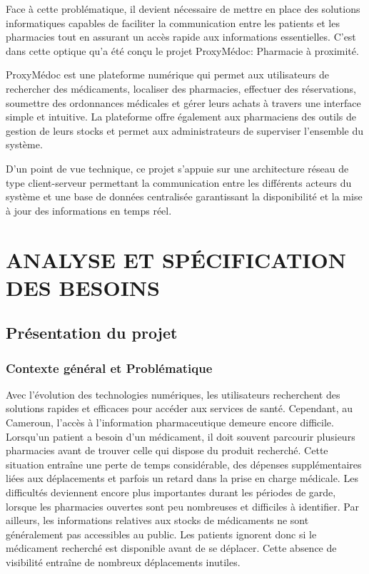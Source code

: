 \documentclass[12pt,a4paper]{report}
\begin{document}
Face à cette problématique, il devient nécessaire de mettre en place des solutions informatiques capables de faciliter la communication entre les patients et les pharmacies tout en assurant un accès rapide aux informations essentielles. C'est dans cette optique qu'a été conçu le projet ProxyMédoc: Pharmacie à proximité.

ProxyMédoc est une plateforme numérique qui permet aux utilisateurs de rechercher des médicaments, localiser des pharmacies, effectuer des réservations, soumettre des ordonnances médicales et gérer leurs achats à travers une interface simple et intuitive. La plateforme offre également aux pharmaciens des outils de gestion de leurs stocks et permet aux administrateurs de superviser l'ensemble du système.

D'un point de vue technique, ce projet s'appuie sur une architecture réseau de type client-serveur permettant la communication entre les différents acteurs du système et une base de données centralisée garantissant la disponibilité et la mise à jour des informations en temps réel.
	
	
	\part{ANALYSE ET SPÉCIFICATION DES BESOINS} %
	
	\chapter{Présentation du projet} %
	
	\section{Contexte général et Problématique} %
	Avec l'évolution des technologies numériques, les utilisateurs recherchent des solutions rapides et efficaces pour accéder aux services de santé. %
	Cependant, au Cameroun, l'accès à l'information pharmaceutique demeure encore difficile. %
	Lorsqu'un patient a besoin d'un médicament, il doit souvent parcourir plusieurs pharmacies avant de trouver celle qui dispose du produit recherché. %
	Cette situation entraîne une perte de temps considérable, des dépenses supplémentaires liées aux déplacements et parfois un retard dans la prise en charge médicale. %
	Les difficultés deviennent encore plus importantes durant les périodes de garde, lorsque les pharmacies ouvertes sont peu nombreuses et difficiles à identifier. %
	Par ailleurs, les informations relatives aux stocks de médicaments ne sont généralement pas accessibles au public. %
	Les patients ignorent donc si le médicament recherché est disponible avant de se déplacer. %
	Cette absence de visibilité entraîne de nombreux déplacements inutiles. %
	
\end{document}
